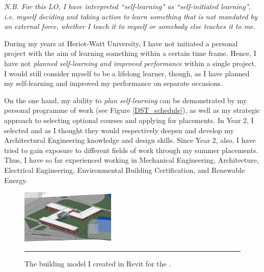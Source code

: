 \textit{N.B. For this LO, I have interpreted ``self-learning" as ``self-initiated learning", i.e. 
myself deciding and taking action to learn something that is not mandated by an external force,
whether I teach it to myself or somebody else teaches it to me.}

During my years at Heriot-Watt University, I have not initiated a personal project with the aim of learning something within a certain time frame.
Hence, I have not \emph{planned self-learning and improved performance} within a single project.
I would still consider myself to be a lifelong learner, though, as I have planned my self-learning and improved my performance on separate occasions.


On the one hand, my ability to \emph{plan self-learning} can be demonstrated by my personal programme of \DST \space work (see Figure \ref{DST_schedule}), as well as my strategic approach to selecting optional courses and applying for placements.
In Year 2, I selected \HYD \space and \DPB \space as I thought they would respectively deepen and develop my Architectural Engineering knowledge and design skills.
Since Year 2, also, I have tried to gain exposure to different fields of work through my summer placements.
Thus, I have so far experienced working in Mechanical Engineering, Architecture, Electrical Engineering, Environmental Building Certification, and Renewable Energy.

\begin{figure}
	\centering
	\includegraphics[width=0.4\textwidth]{figures/South.PNG}
	\rule{0.4\textwidth}{0.5pt} %
	\caption{The building model I created in Revit for the \PRJTitle.}
	\label{fig:revit}
\end{figure}


